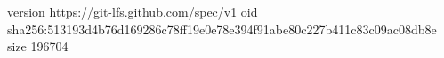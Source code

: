version https://git-lfs.github.com/spec/v1
oid sha256:513193d4b76d169286c78ff19e0e78e394f91abe80c227b411c83c09ac08db8e
size 196704
